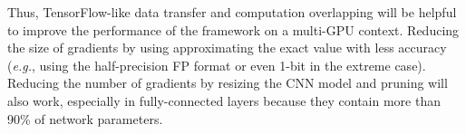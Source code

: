 Thus, TensorFlow-like data transfer and computation overlapping will be helpful to improve the performance of the framework on a multi-GPU context. Reducing the size of gradients by using approximating the exact value with less accuracy (\textit{e.g.}, using the half-precision FP format or even 1-bit in the extreme case\cite{1-bit-stochastic-gradient-descent-and-application-to-data-parallel-distributed-training-of-speech-dnns}). Reducing the number of gradients by resizing the CNN model and pruning will also work, especially in fully-connected layers because they contain more than 90\% of network parameters.



